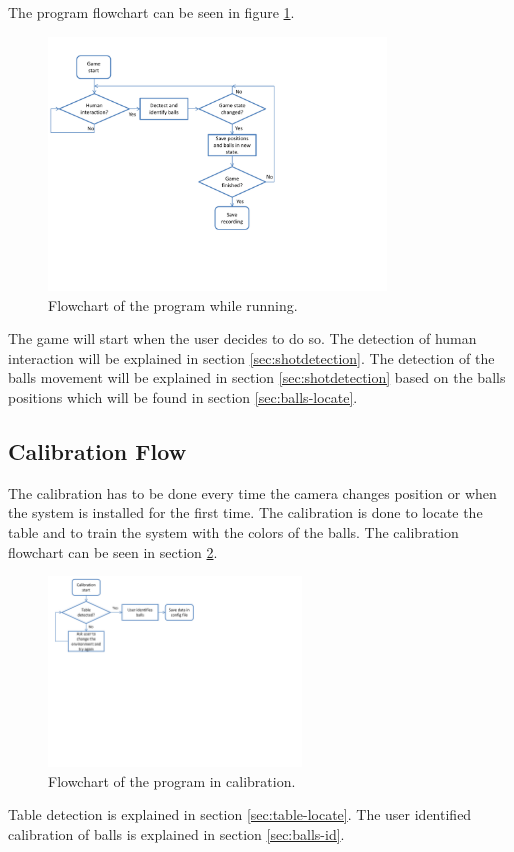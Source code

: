 The program flowchart can be seen in figure \ref{fig:program_flowchart}.

\begin{figure}[htpb]
\begin{center}
\leavevmode
\includegraphics[width=0.8\textwidth]{images/program_flowchart}
\end{center}
\caption{Flowchart of the program while running.}
\label{fig:program_flowchart}
\end{figure}

The game will start when the user decides to do so. The detection of human interaction will be explained in section \ref{sec:shotdetection}. The detection of the balls movement will be explained in section \ref{sec:shotdetection} based on the balls positions which will be found in section \ref{sec:balls-locate}.

\subsection{Calibration Flow}
The calibration has to be done every time the camera changes position or when the system is installed for the first time. The calibration is done to locate the table and to train the system with the colors of the balls. The calibration flowchart can be seen in section \ref{fig:calib_flowchart}.

\begin{figure}[htpb]
\begin{center}
\leavevmode
\includegraphics[width=0.6\textwidth]{images/calib_flowchart}
\end{center}
\caption{Flowchart of the program in calibration.}
\label{fig:calib_flowchart}
\end{figure}

Table detection is explained in section \ref{sec:table-locate}. The user identified calibration of balls is explained in section \ref{sec:balls-id}.